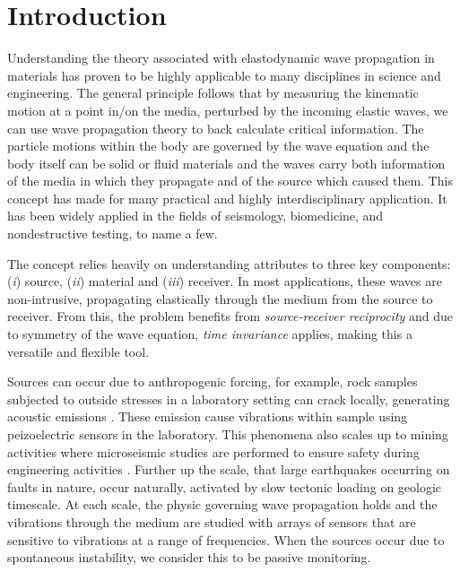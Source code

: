\documentclass[preprint,3p, 11pt,authoryear]{elsarticle}
\begin{document}
\doublespacing
\linenumbers
\clearpage
\section{Introduction}
\label{int}

Understanding the theory associated with elastodynamic wave propagation in materials has proven to be highly applicable to many disciplines in science and engineering. The general principle follows that by measuring the kinematic motion at a point in/on the media, perturbed by the incoming elastic waves, we can use wave propagation theory to back calculate critical information. The particle motions within the body are governed by the wave equation and the body itself can be solid or fluid materials and the waves carry both information of the media in which they propagate and of the source which caused them. This concept has made for many practical and highly interdisciplinary application. It has been widely applied in the fields of seismology, biomedicine, and nondestructive testing, to name a few.

The concept relies heavily on understanding attributes to three key components: (\textit{i}) source, (\textit{ii}) material and (\textit{iii}) receiver. In most applications, these waves are non-intrusive, propagating elastically through the medium from the source to receiver. From this, the problem benefits from \textit{source-receiver reciprocity} and due to symmetry of the wave equation, \textit{time invariance} applies, making this a versatile and flexible tool.  

Sources can occur due to anthropogenic forcing, for example, rock samples subjected to outside stresses in a laboratory setting can crack locally, generating acoustic emissions \citep[e.g.][]{Lei2014}. These emission cause vibrations within sample using peizoelectric sensors in the laboratory. This phenomena also scales up to mining activities where microseismic studies are performed to ensure safety during engineering activities \citep[e.g.][]{Manthei2018}. Further up the scale, that large earthquakes occurring on faults in nature, occur naturally, activated by slow tectonic loading on geologic timescale. At each scale, the physic governing wave propagation holds and the vibrations through the medium are studied with arrays of sensors that are sensitive to vibrations at a range of frequencies. When the sources occur due to spontaneous instability, we consider this to be passive monitoring.
\end{document}
